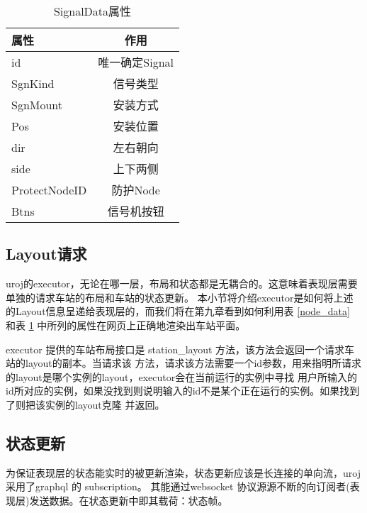 \begin{table}[htpb!]
    \centering
    \caption{\label{sgn_data}SignalData属性}
    \begin{threeparttable}
        \begin{tabular}{lc}
            \toprule
            属性          & 作用           \\
            \midrule
            id            & 唯一确定Signal \\
            SgnKind       & 信号类型       \\
            SgnMount      & 安装方式       \\
            Pos           & 安装位置       \\
            dir           & 左右朝向       \\
            side          & 上下两侧       \\
            ProtectNodeID & 防护Node       \\
            Btns          & 信号机按钮     \\
            \bottomrule
        \end{tabular}
    \end{threeparttable}
\end{table}

\subsection{Layout请求}
uroj的executor，无论在哪一层，布局和状态都是无耦合的。这意味着表现层需要单独的请求车站的布局和车站的状态更新。
本小节将介绍executor是如何将上述的Layout信息呈递给表现层的，而我们将在第九章看到如何利用表 \ref{node_data}
和表 \ref{sgn_data} 中所列的属性在网页上正确地渲染出车站平面。

executor 提供的车站布局接口是 station\_layout 方法，该方法会返回一个请求车站的layout的副本。当请求该
方法，请求该方法需要一个id参数，用来指明所请求的layout是哪个实例的layout，executor会在当前运行的实例中寻找
用户所输入的id所对应的实例，如果没找到则说明输入的id不是某个正在运行的实例。如果找到了则把该实例的layout克隆
并返回。

\subsection{状态更新}
为保证表现层的状态能实时的被更新渲染，状态更新应该是长连接的单向流，uroj采用了graphql 的 subscription。
其能通过websocket 协议源源不断的向订阅者(表现层)发送数据。在状态更新中即其载荷：状态帧。

